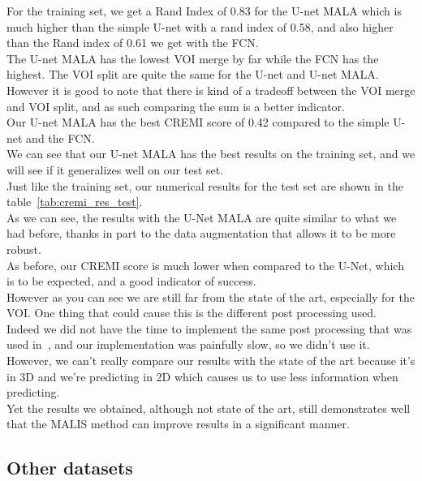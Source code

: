 For the training set, we get a Rand Index of 0.83 for the U-net MALA which is much higher than the simple U-net with a rand index of 0.58, and also higher than the Rand index of 0.61 we get with the FCN.\\
The U-net MALA has the lowest VOI merge by far while the FCN has the highest. The VOI split are quite the same for the U-net and U-net MALA.\\
However it is good to note that there is kind of a tradeoff between the VOI merge and VOI split, and as such comparing the sum is a better indicator.\\
Our U-net MALA has the best CREMI score of 0.42 compared to the simple U-net and the FCN.\\ 
We can see that our U-net MALA has the best results on the training set, and we
will see if it generalizes well on our test set.\\

Just like the training set, our numerical results for the test set are shown in the table~\ref{tab:cremi_res_test}.\\
As we can see, the results with the U-Net MALA are quite similar to what we had before, thanks in part to the data augmentation that allows it to be more robust.\\
As before, our CREMI score is much lower when compared to the U-Net, which is to be expected, and a good indicator of success.\\

However as you can see we are still far from the state of the art, especially for the VOI. One thing that could cause this is the different post processing used.\\ 
Indeed we did not have the time to implement the same post processing that was
used in~\cite{funke_large_2019}, and our implementation was painfully slow, so
we didn't use it.\\
However, we can’t really compare our results with the state of the art because it’s in 3D and we’re predicting in 2D which causes us to use less information when predicting.\\
Yet the results we obtained, although not state of the art, still demonstrates
well that the MALIS method can improve results in a significant manner.\\

\subsection{Other datasets}

